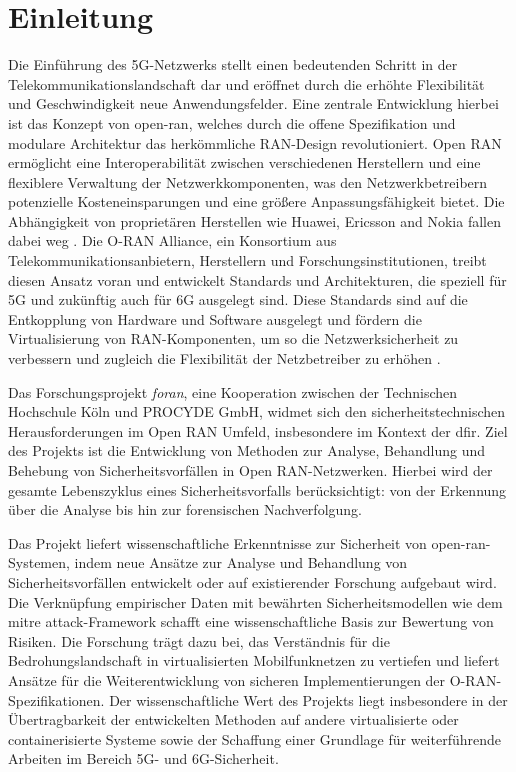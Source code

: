\chapter{Einleitung}
\label{chap:Einleitung}

\par
Die Einführung des 5G-Netzwerks stellt einen bedeutenden Schritt in der Telekommunikationslandschaft dar und eröffnet durch die erhöhte Flexibilität und Geschwindigkeit neue Anwendungsfelder. Eine zentrale Entwicklung hierbei ist das Konzept von \gls{open-ran}, welches durch die offene Spezifikation und modulare Architektur das herkömmliche RAN-Design revolutioniert. Open RAN ermöglicht eine Interoperabilität zwischen verschiedenen Herstellern und eine flexiblere Verwaltung der Netzwerkkomponenten, was den Netzwerkbetreibern potenzielle Kosteneinsparungen und eine größere Anpassungsfähigkeit bietet. Die Abhängigkeit von proprietären Herstellen wie Huawei, Ericsson and Nokia fallen dabei weg \autocite{NokiaEricssonUnd}. Die O-RAN Alliance, ein Konsortium aus Telekommunikationsanbietern, Herstellern und Forschungsinstitutionen, treibt diesen Ansatz voran und entwickelt Standards und Architekturen, die speziell für 5G und zukünftig auch für 6G ausgelegt sind. Diese Standards sind auf die Entkopplung von Hardware und Software ausgelegt und fördern die Virtualisierung von RAN-Komponenten, um so die Netzwerksicherheit zu verbessern und zugleich die Flexibilität der Netzbetreiber zu erhöhen \autocite{5GFORAN}.
\par
Das Forschungsprojekt \textit{\gls{foran}}, eine Kooperation zwischen der Technischen Hochschule Köln und PROCYDE GmbH, widmet sich den sicherheitstechnischen Herausforderungen im Open RAN Umfeld, insbesondere im Kontext der \gls{dfir}. Ziel des Projekts ist die Entwicklung von Methoden zur Analyse, Behandlung und Behebung von Sicherheitsvorfällen in Open RAN-Netzwerken. Hierbei wird der gesamte Lebenszyklus eines Sicherheitsvorfalls berücksichtigt: von der Erkennung über die Analyse bis hin zur forensischen Nachverfolgung. 
\par Das Projekt liefert wissenschaftliche Erkenntnisse zur Sicherheit von \gls{open-ran}-Systemen, indem neue Ansätze zur Analyse und Behandlung von Sicherheitsvorfällen entwickelt oder auf existierender Forschung aufgebaut wird. Die Verknüpfung empirischer Daten mit bewährten Sicherheitsmodellen wie dem \gls{mitre} \gls{attack}-Framework schafft eine wissenschaftliche Basis zur Bewertung von Risiken. Die Forschung trägt dazu bei, das Verständnis für die Bedrohungslandschaft in virtualisierten Mobilfunknetzen zu vertiefen und liefert Ansätze für die Weiterentwicklung von sicheren Implementierungen der O-RAN-Spezifikationen. Der wissenschaftliche Wert des Projekts liegt insbesondere in der Übertragbarkeit der entwickelten Methoden auf andere virtualisierte oder containerisierte Systeme sowie der Schaffung einer Grundlage für weiterführende Arbeiten im Bereich 5G- und 6G-Sicherheit.
